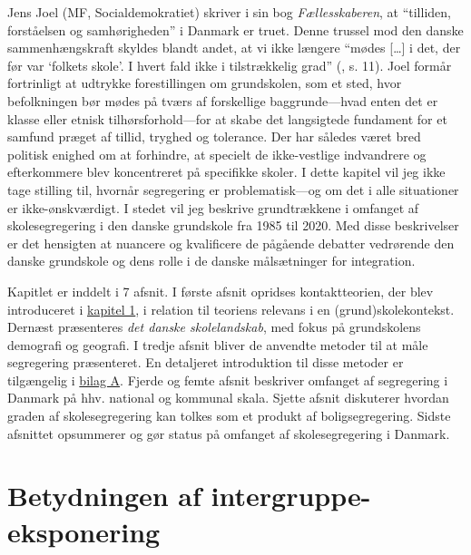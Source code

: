 \documentclass[
]{book}
\begin{document}
Jens Joel (MF, Socialdemokratiet) skriver i sin bog \emph{Fællesskaberen}, at ``tilliden, forståelsen og samhørigheden'' i Danmark er truet. Denne trussel mod den danske sammenhængskraft skyldes blandt andet, at vi ikke længere ``mødes {[}\ldots{]} i det, der før var `folkets skole'. I hvert fald ikke i tilstrækkelig grad'' (, s. 11). Joel formår fortrinligt at udtrykke forestillingen om grundskolen, som et sted, hvor befolkningen bør mødes på tværs af forskellige baggrunde---hvad enten det er klasse eller etnisk tilhørsforhold---for at skabe det langsigtede fundament for et samfund præget af tillid, tryghed og tolerance. Der har således været bred politisk enighed om at forhindre, at specielt de ikke-vestlige indvandrere og efterkommere blev koncentreret på specifikke skoler. I dette kapitel vil jeg ikke tage stilling til, hvornår segregering er problematisk---og om det i alle situationer er ikke-ønskværdigt. I stedet vil jeg beskrive grundtrækkene i omfanget af skolesegregering i den danske grundskole fra 1985 til 2020. Med disse beskrivelser er det hensigten at nuancere og kvalificere de pågående debatter vedrørende den danske grundskole og dens rolle i de danske målsætninger for integration.

Kapitlet er inddelt i 7 afsnit. I første afsnit opridses kontaktteorien, der blev introduceret i \hyperref[kap1]{kapitel 1}, i relation til teoriens relevans i en (grund)skolekontekst. Dernæst præsenteres \emph{det danske skolelandskab}, med fokus på grundskolens demografi og geografi. I tredje afsnit bliver de anvendte metoder til at måle segregering præsenteret. En detaljeret introduktion til disse metoder er tilgængelig i \hyperref[bilag1]{bilag A}. Fjerde og femte afsnit beskriver omfanget af segregering i Danmark på hhv. national og kommunal skala. Sjette afsnit diskuterer hvordan graden af skolesegregering kan tolkes som et produkt af boligsegregering. Sidste afsnittet opsummerer og gør status på omfanget af skolesegregering i Danmark.

\section{Betydningen af intergruppe-eksponering}\label{betydningen-af-intergruppe-eksponering}
\end{document}
